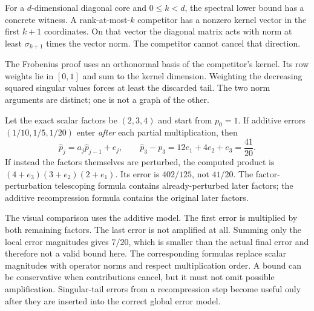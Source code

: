 For a $d$-dimensional diagonal core and $0\le k<d$, the spectral lower bound has a concrete witness. A rank-at-most-$k$ competitor has a nonzero kernel vector in the first $k+1$ coordinates. On that vector the diagonal matrix acts with norm at least $\sigma_{k+1}$ times the vector norm. The competitor cannot cancel that direction.

The Frobenius proof uses an orthonormal basis of the competitor's kernel. Its row weights lie in $[0,1]$ and sum to the kernel dimension. Weighting the decreasing squared singular values forces at least the discarded tail. The two norm arguments are distinct; one is not a graph of the other.

Let the exact scalar factors be $(2,3,4)$ and start from $p_0=1$. If additive errors $(1/10,1/5,1/20)$ enter \emph{after} each partial multiplication, then
\[
\widehat p_j=a_j\widehat p_{j-1}+e_j,\qquad
\widehat p_3-p_3=12e_1+4e_2+e_3=\frac{41}{20}.
\]
If instead the factors themselves are perturbed, the computed product is $(4+e_3)(3+e_2)(2+e_1)$. Its error is $402/125$, not $41/20$. The factor-perturbation telescoping formula contains already-perturbed later factors; the additive recompression formula contains the original later factors.

The visual comparison uses the additive model. The first error is multiplied by both remaining factors. The last error is not amplified at all. Summing only the local error magnitudes gives $7/20$, which is smaller than the actual final error and therefore not a valid bound here.
The corresponding formulas replace scalar magnitudes with operator norms and respect multiplication order. A bound can be conservative when contributions cancel, but it must not omit possible amplification. Singular-tail errors from a recompression step become useful only after they are inserted into the correct global error model.


